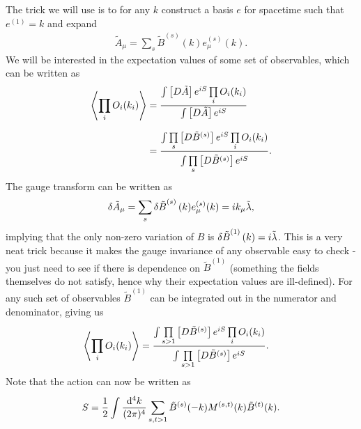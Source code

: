 The trick we will use is to for any $k$ construct a basis $e$ for spacetime such that $e^{(1)} = k$ and expand
\begin{align*}
\tilde{A}_{\mu} = \sum\limits_{s}\tilde{B}^{(s)}(k)e_{\mu}^{(s)}(k).
\end{align*}
We will be interested in the expectation values of some set of observables, which can be written as
\begin{align*}
\expval{\prod\limits_{i}O_{i}(k_{i})} &= \frac{\int\limits_{}\left[D\tilde{A}\right]e^{iS}\prod\limits_{i}O_{i}(k_{i})}{\int\limits_{}\left[D\tilde{A}\right]e^{iS}} \\
&= \frac{\int\limits_{}^{}\prod\limits_{s}\left[D\tilde{B}^{(s)}\right]e^{iS}\prod\limits_{i}O_{i}(k_{i})}{\int\limits_{}^{}\prod\limits_{s}\left[D\tilde{B}^{(s)}\right]e^{iS}}.
\end{align*}
The gauge transform can be written as
\begin{align*}
\var{\tilde{A}_{\mu}} = \sum\limits_{s}\var{\tilde{B}}^{(s)}(k)e_{\mu}^{(s)}(k) = ik_{\mu}\tilde{\lambda},
\end{align*}
implying that the only non-zero variation of $B$ is $\var{\tilde{B}}^{(1)}(k) = i\tilde{\lambda}$. This is a very neat trick because it makes the gauge invariance of any observable easy to check - you just need to see if there is dependence on $\tilde{B}^{(1)}$ (something the fields themselves do not satisfy, hence why their expectation values are ill-defined). For any such set of observables $\tilde{B}^{(1)}$ can be integrated out in the numerator and denominator, giving us
\begin{align*}
\expval{\prod\limits_{i}O_{i}(k_{i})} &= \frac{\int\limits_{}^{}\prod\limits_{s > 1}\left[D\tilde{B}^{(s)}\right]e^{iS}\prod\limits_{i}O_{i}(k_{i})}{\int\limits_{}^{}\prod\limits_{s > 1}\left[D\tilde{B}^{(s)}\right]e^{iS}}.
\end{align*}
Note that the action can now be written as
\begin{align*}
S = \frac{1}{2}\int\limits_{}^{}\frac{\dd[4]{k}}{(2\pi)^{4}}\sum\limits_{s, t > 1}\tilde{B}^{(s)}(-k)M^{(s, t)}(k)\tilde{B}^{(t)}(k).
\end{align*}

